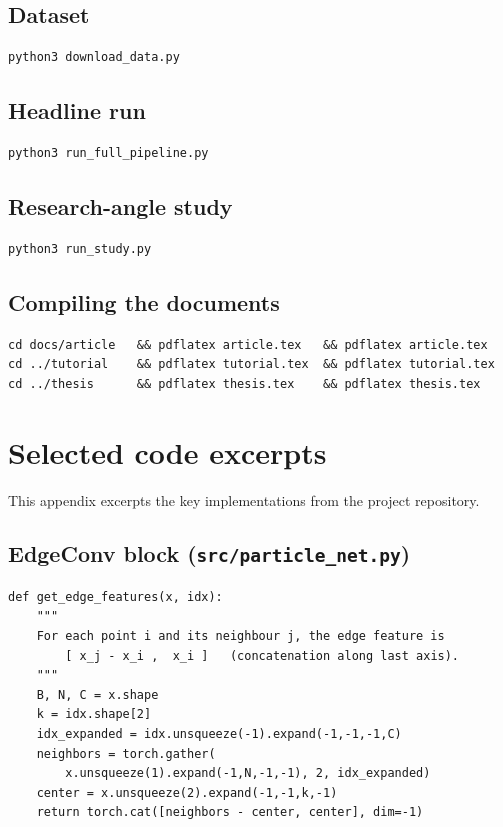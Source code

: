 \documentclass[12pt,a4paper,oneside]{report}
\begin{document}
\section{Dataset}
\begin{verbatim}
python3 download_data.py
\end{verbatim}

\section{Headline run}
\begin{verbatim}
python3 run_full_pipeline.py
\end{verbatim}

\section{Research-angle study}
\begin{verbatim}
python3 run_study.py
\end{verbatim}

\section{Compiling the documents}
\begin{verbatim}
cd docs/article   && pdflatex article.tex   && pdflatex article.tex
cd ../tutorial    && pdflatex tutorial.tex  && pdflatex tutorial.tex
cd ../thesis      && pdflatex thesis.tex    && pdflatex thesis.tex
\end{verbatim}

\chapter{Selected code excerpts}\label{app:code}
This appendix excerpts the key implementations from the project
repository.

\section{EdgeConv block (\texttt{src/particle\_net.py})}
{\footnotesize
\begin{verbatim}
def get_edge_features(x, idx):
    """
    For each point i and its neighbour j, the edge feature is
        [ x_j - x_i ,  x_i ]   (concatenation along last axis).
    """
    B, N, C = x.shape
    k = idx.shape[2]
    idx_expanded = idx.unsqueeze(-1).expand(-1,-1,-1,C)
    neighbors = torch.gather(
        x.unsqueeze(1).expand(-1,N,-1,-1), 2, idx_expanded)
    center = x.unsqueeze(2).expand(-1,-1,k,-1)
    return torch.cat([neighbors - center, center], dim=-1)
\end{verbatim}}
\end{document}

